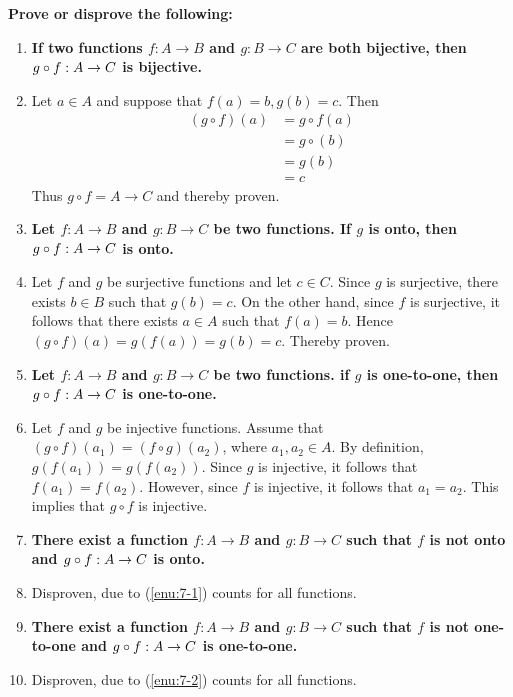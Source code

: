 \documentclass[english,11pt,a4paper]{article}
\begin{document}
\textbf{Prove or disprove the following:}

\begin{enumerate}[a]
\item \textbf{If two functions $f: A \rightarrow B$ and $g: B \rightarrow C$ are both bijective, then $g \circ f: A \rightarrow C$ is bijective.}
\item[] Let $a \in A$ and suppose that $f(a)=b, g(b)=c$. Then
\begin{align}
(g\circ f)(a) &= g \circ f(a)\\
	&= g\circ (b)\\
	&= g(b)\\
	&= c
\end{align}
Thus $g \circ f = A \rightarrow C$ and thereby proven.

\item \label{enu:7-1}\textbf{Let $f: A \rightarrow B$ and $g: B \rightarrow C$ be two functions. If $g$ is onto, then $g \circ f: A \rightarrow C$ is onto.}
\item[] Let $f$ and $g$ be surjective functions and let $c \in C$. Since $g$ is surjective, there exists $b\in B$ such that $g(b)=c$. On the other hand, since $f$ is surjective, it follows that there exists $a \in A$ such that $f(a)=b$. Hence $(g \circ f)(a)=g(f(a))=g(b)=c$. Thereby proven.

\item \label{enu:7-2}\textbf{Let $f: A \rightarrow B$ and $g: B \rightarrow C$ be two functions. if $g$ is one-to-one, then $g \circ f:A \rightarrow C$ is one-to-one.}
\item[]Let $f$ and $g$ be injective functions. Assume that $(g\circ f)(a_1)=(f \circ g)(a_2)$, where $a_1, a_2 \in A$. By definition, $g(f(a_1))=g(f(a_2))$. Since $g$ is injective, it follows that $f(a_1)=f(a_2)$. However, since $f$ is injective, it follows that $a_1=a_2$. This implies that $g \circ f$ is injective.

\item \textbf{There exist a function $f: A \rightarrow B$ and $g: B \rightarrow C$ such that $f$ is not onto and $g\circ f: A \rightarrow C$ is onto.}
\item[] Disproven, due to (\ref{enu:7-1}) counts for all functions.

\item \textbf{There exist a function $f: A \rightarrow B$ and $g: B \rightarrow C$ such that $f$ is not one-to-one and $g\circ f: A \rightarrow C$ is one-to-one.}
\item[] Disproven, due to (\ref{enu:7-2}) counts for all functions.
\end{enumerate}
\end{document}
